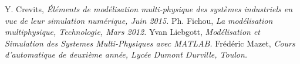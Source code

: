 \documentclass[10pt,fleqn]{article} %
\begin{document}
\begin{thebibliography}{2}
    Y. Crevits, {\it Éléments de modélisation multi-physique des systèmes industriels en vue de leur simulation numérique, Juin 2015.}
    Ph. Fichou, {\it La modélisation multiphysique, Technologie, Mars 2012.}
    Yvan Liebgott, {\it Modélisation et Simulation des Systemes Multi-Physiques avec MATLAB.}
    Frédéric Mazet, {\it Cours d'automatique de deuxième année, Lycée Dumont Durville, Toulon.}

\end{thebibliography}
\end{document}
